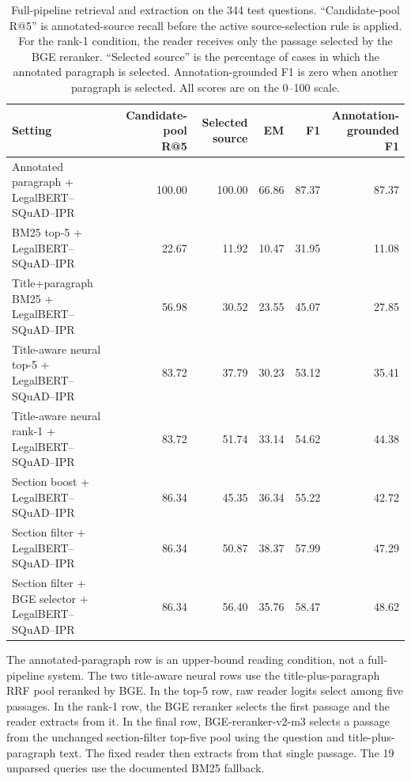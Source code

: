 \documentclass[pdflatex,sn-basic]{sn-jnl}%
\theoremstyle{thmstyleone}%
\theoremstyle{thmstyletwo}%
\theoremstyle{thmstylethree}%
\newcommand{\fixedreader}{LegalBERT--SQuAD--IPR}
\begin{document}
\begin{table}[!htbp]
    \caption{Full-pipeline retrieval and extraction on the 344 test questions.
    ``Candidate-pool R@5'' is annotated-source recall before the active
    source-selection rule is applied. For the rank-1 condition, the reader
    receives only the passage selected by the BGE reranker. ``Selected source''
    is the percentage of cases in which the annotated paragraph is selected.
    Annotation-grounded F1 is zero when another paragraph is selected.
    All scores are on the 0--100 scale.}
    \label{tab:citation_aware_end_to_end}
    \centering
    \scriptsize
    \setlength{\tabcolsep}{3pt}
    \renewcommand{\arraystretch}{1.13}
    \begin{tabular}{@{}>{\raggedright\arraybackslash}p{4.4cm}rrrrr@{}}
        \toprule
        Setting & \shortstack{Candidate-pool\\R@5} &
        Selected source & EM & F1 &
        \shortstack{Annotation-\\grounded F1} \\
        \midrule
        Annotated paragraph + \fixedreader{} & 100.00 & 100.00 & 66.86 & 87.37 & 87.37 \\
        BM25 top-5 + \fixedreader{} & 22.67 & 11.92 & 10.47 & 31.95 & 11.08 \\
        Title+paragraph BM25 + \fixedreader{} & 56.98 & 30.52 & 23.55 & 45.07 & 27.85 \\
        Title-aware neural top-5 + \fixedreader{} & 83.72 & 37.79 & 30.23 & 53.12 & 35.41 \\
        Title-aware neural rank-1 + \fixedreader{} & 83.72 & 51.74 & 33.14 & 54.62 & 44.38 \\
        Section boost + \fixedreader{} & 86.34 & 45.35 & 36.34 & 55.22 & 42.72 \\
        Section filter + \fixedreader{} & 86.34 & 50.87 & 38.37 & 57.99 & 47.29 \\
        Section filter + BGE selector + \fixedreader{} & 86.34 & 56.40 & 35.76 & 58.47 & 48.62 \\
        \bottomrule
    \end{tabular}
    \begin{flushleft}
        {\scriptsize The annotated-paragraph row is an upper-bound reading
        condition, not a full-pipeline system. The two title-aware neural rows
        use the title-plus-paragraph RRF pool reranked by BGE. In the top-5
        row, raw reader logits select among five passages. In the rank-1 row,
        the BGE reranker selects the first passage and the reader extracts
        from it. In the final row, BGE-reranker-v2-m3 selects a passage from
        the unchanged section-filter top-five pool using the question and
        title-plus-paragraph text. The fixed reader then extracts from that
        single passage. The 19 unparsed queries use the documented BM25
        fallback.}
    \end{flushleft}
\end{table}
\FloatBarrier
\end{document}

